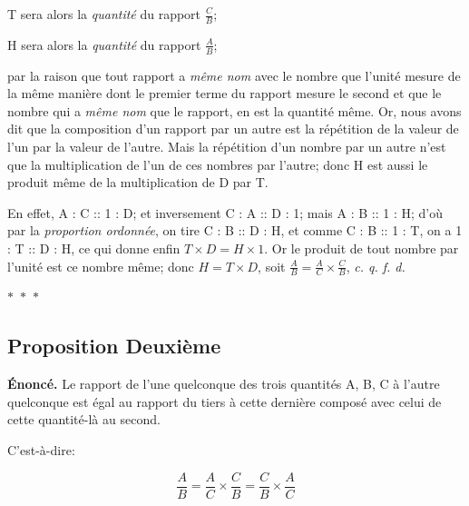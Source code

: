 \documentclass[11pt,a4paper]{article}
\theoremstyle{plain}
\theoremstyle{definition}
\theoremstyle{remark}
\newcommand{\ornament}{\begin{center}\textcolor{goldaccent}{$\ast$~$\ast$~$\ast$}\end{center}}
\begin{document}
T sera alors la \textit{quantité} du rapport $\frac{C}{B}$;



H sera alors la \textit{quantité} du rapport $\frac{A}{B}$;



par la raison que tout rapport a \textit{même nom} avec le nombre que l'unité mesure de la même manière dont le premier terme du rapport mesure le second et que le nombre qui a \textit{même nom} que le rapport, en est la quantité même. Or, nous avons dit que la composition d'un rapport par un autre est la répétition de la valeur de l'un par la valeur de l'autre. Mais la répétition d'un nombre par un autre n'est que la multiplication de l'un de ces nombres par l'autre; donc H est aussi le produit même de la multiplication de D par T.



En effet, A : C :: 1 : D; et inversement C : A :: D : 1; mais A : B :: 1 : H; d'où par la \textit{proportion ordonnée}, on tire C : B :: D : H, et comme C : B :: 1 : T, on a 1 : T :: D : H, ce qui donne enfin $T \times D = H \times 1$. Or le produit de tout nombre par l'unité est ce nombre même; donc $H = T \times D$, soit $\frac{A}{B} = \frac{A}{C} \times \frac{C}{B}$, \textit{c. q. f. d.}





\ornament






\subsection{Proposition Deuxième}

\label{prop:2}





\textbf{Énoncé.} Le rapport de l'une quelconque des trois quantités A, B, C à l'autre quelconque est égal au rapport du tiers à cette dernière composé avec celui de cette quantité-là au second.



C'est-à-dire:

\[

\frac{A}{B} = \frac{A}{C} \times \frac{C}{B} = \frac{C}{B} \times \frac{A}{C}

\]
\end{document}
